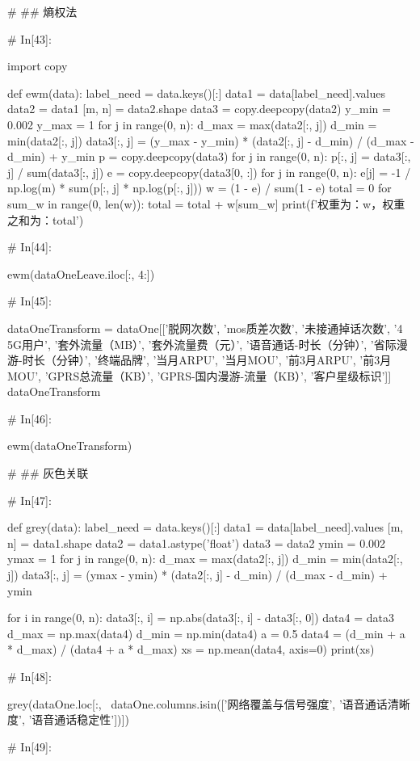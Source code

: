 \documentclass{MathorCupmodeling}
\begin{document}
\begin{python}
	# ## 熵权法
	
	# In[43]:
	
	
	import copy
	
	
	def ewm(data):
		label_need = data.keys()[:]
		data1 = data[label_need].values
		data2 = data1
		[m, n] = data2.shape
		data3 = copy.deepcopy(data2)
		y_min = 0.002
		y_max = 1
		for j in range(0, n):
			d_max = max(data2[:, j])
			d_min = min(data2[:, j])
			data3[:, j] = (y_max - y_min) * (data2[:, j] - d_min) / (d_max - d_min) + y_min
		p = copy.deepcopy(data3)
		for j in range(0, n):
			p[:, j] = data3[:, j] / sum(data3[:, j])
		e = copy.deepcopy(data3[0, :])
		for j in range(0, n):
			e[j] = -1 / np.log(m) * sum(p[:, j] * np.log(p[:, j]))
		w = (1 - e) / sum(1 - e)
		total = 0
		for sum_w in range(0, len(w)):
			total = total + w[sum_w]
		print(f'权重为：{w}，权重之和为：{total}')
	
	
	# In[44]:
	
	
	ewm(dataOneLeave.iloc[:, 4:])
	
	# In[45]:
	
	
	dataOneTransform = dataOne[['脱网次数', 'mos质差次数', '未接通掉话次数', '4\\5G用户', '套外流量（MB）', '套外流量费（元）', '语音通话-时长（分钟）', '省际漫游-时长（分钟）', '终端品牌', '当月ARPU', '当月MOU', '前3月ARPU', '前3月MOU', 'GPRS总流量（KB）', 'GPRS-国内漫游-流量（KB）', '客户星级标识']]
	dataOneTransform
	
	# In[46]:
	
	
	ewm(dataOneTransform)
	
	
	# ## 灰色关联
	
	# In[47]:
	
	
	def grey(data):
		label_need = data.keys()[:]
		data1 = data[label_need].values
		[m, n] = data1.shape
		data2 = data1.astype('float')
		data3 = data2
		ymin = 0.002
		ymax = 1
		for j in range(0, n):
			d_max = max(data2[:, j])
			d_min = min(data2[:, j])
			data3[:, j] = (ymax - ymin) * (data2[:, j] - d_min) / (d_max - d_min) + ymin
	
		for i in range(0, n):
			data3[:, i] = np.abs(data3[:, i] - data3[:, 0])
		data4 = data3
		d_max = np.max(data4)
		d_min = np.min(data4)
		a = 0.5
		data4 = (d_min + a * d_max) / (data4 + a * d_max)
		xs = np.mean(data4, axis=0)
		print(xs)
	
	
	# In[48]:
	
	
	grey(dataOne.loc[:, ~dataOne.columns.isin(['网络覆盖与信号强度', '语音通话清晰度', '语音通话稳定性'])])
	
	# In[49]:
	

\end{python}
\end{document}
